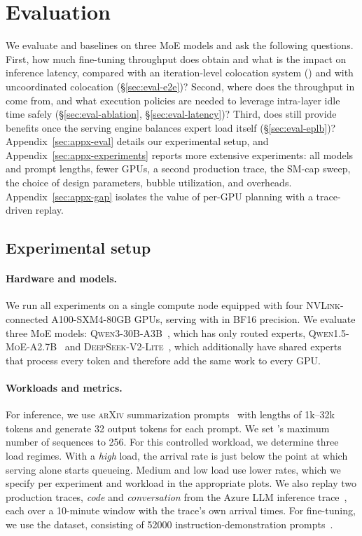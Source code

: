 \section{Evaluation}
\label{sec:evaluation}

We evaluate \sys and baselines on three \ac{MoE} models and ask the following questions.
First, how much fine-tuning throughput does \sys obtain and what is the impact on inference latency, compared with an iteration-level colocation system (\llmstation) and with uncoordinated colocation (\S\ref{sec:eval-e2e})?
Second, where does the throughput in \sys come from, and what execution policies are needed to leverage
intra-layer idle time safely (\S\ref{sec:eval-ablation}, \S\ref{sec:eval-latency})?
Third, does \sys still provide  benefits once the serving engine balances expert load itself (\S\ref{sec:eval-eplb})?
Appendix~\ref{sec:appx-eval} details our experimental setup, and Appendix~\ref{sec:appx-experiments} reports more extensive experiments: all models and prompt lengths, fewer GPUs, a second production trace, the \uncoord \ac{SM}-cap sweep, the choice of design parameters, bubble utilization, and overheads. Appendix~\ref{sec:appx-gap} isolates the value of per-GPU planning with a trace-driven replay.

\subsection{Experimental setup}
\label{sec:eval-method}

\paragraph{Hardware and models.}
We run all experiments on a single compute node equipped with four \textsc{NVLink}-connected A100-SXM4-80GB GPUs, serving with \vllm in BF16 precision.
We evaluate three \ac{MoE} models: \textsc{Qwen3-30B-A3B}~\cite{qwen3}, which has only routed experts,
\textsc{Qwen1.5-MoE-A2.7B}~\cite{qwen1.5_moe} and \textsc{DeepSeek-V2-Lite}~\cite{deepseekv2}, which additionally have shared experts that process every token and therefore add the same work to every GPU.

\paragraph{Workloads and metrics.}
For inference, we use \textsc{arXiv} summarization prompts~\cite{cohan-etal-2018-discourse} with lengths of 1k--32k tokens and generate 32 output tokens for each prompt.
We set \vllm's maximum number of sequences to 256.
For this controlled workload, we determine three load regimes.
With a \emph{high} load, the arrival rate is just below the point at which serving alone starts queueing.
Medium and low load use lower rates, which we specify per experiment and workload in the appropriate plots.
We also replay two production traces, \emph{code} and \emph{conversation} from the Azure LLM inference trace~\cite{splitwise}, each over a 10-minute window with the trace's own arrival times.
For fine-tuning, we use the \alpaca dataset, consisting of \num{52000} instruction-demonstration prompts~\cite{alpaca}.

